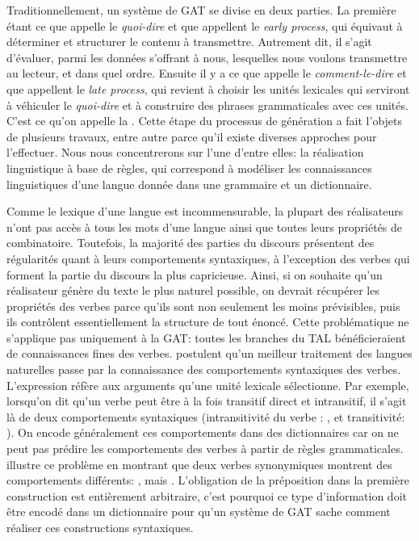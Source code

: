 Traditionnellement, un système de \ac{GAT} se divise en deux parties. La première étant ce que \cite{DanlosPresentationmodelegeneration1983} appelle le \emph{quoi-dire} et que \cite{gatt18} appellent le \emph{early process}, qui équivaut à déterminer et structurer le contenu à transmettre. Autrement dit, il s'agit d'évaluer, parmi les données s'offrant à nous, lesquelles nous voulons transmettre au lecteur, et dans quel ordre. Ensuite il y a ce que \citeauthor{DanlosPresentationmodelegeneration1983} appelle le \emph{comment-le-dire} et que \citeauthor{gatt18} appellent le \emph{late process}, qui revient à choisir les unités lexicales qui serviront à véhiculer le \emph{quoi-dire} et à construire des phrases grammaticales avec ces unités. C'est ce qu'on appelle la . Cette étape du processus de génération a fait l'objets de plusieurs travaux, entre autre parce qu'il existe diverses approches pour l'effectuer. Nous nous concentrerons sur l'une d'entre elles: la réalisation linguistique à base de règles, qui correspond à modéliser les connaissances linguistiques d'une langue donnée dans une grammaire et un dictionnaire.

Comme le lexique d'une langue est incommensurable, la plupart des réalisateurs n'ont pas accès à tous les mots d'une langue ainsi que toutes leurs propriétés de combinatoire. Toutefois, la majorité des parties du discours présentent des régularités quant à leurs comportements syntaxiques, à l'exception des verbes qui forment la partie du discours la plus capricieuse. Ainsi, si on souhaite qu'un réalisateur génère du texte le plus naturel possible, on devrait récupérer les propriétés des verbes parce qu'ils sont non seulement les moins prévisibles, puis ils contrôlent essentiellement la structure de tout énoncé. Cette problématique ne s'applique pas uniquement à la \ac{GAT}: toutes les branches du \ac{TAL} bénéficieraient de connaissances fines des verbes. \cite{Korhonenlargesubcategorizationlexicon2006, SchulerVerbnetBroadcoverageComprehensive2005} postulent qu'un meilleur traitement des langues naturelles passe par la connaissance des comportements syntaxiques des verbes. L'expression  réfère aux arguments qu'une unité lexicale sélectionne. Par exemple, lorsqu'on dit qu'un verbe peut être à la fois transitif direct et intransitif, il s'agit là de deux comportements syntaxiques (intransitivité du verbe : , et transitivité: ). On encode généralement ces comportements dans des dictionnaires car on ne peut pas prédire les comportements des verbes à partir de règles grammaticales. \cite{MilicevicSchemaregimepont2009} illustre ce problème en montrant que deux verbes synonymiques montrent des comportements différents: , mais . L'obligation de la préposition dans la première construction est entièrement arbitraire, c'est pourquoi ce type d'information doit être encodé dans un dictionnaire pour qu'un système de \ac{GAT} sache comment réaliser ces constructions syntaxiques.

